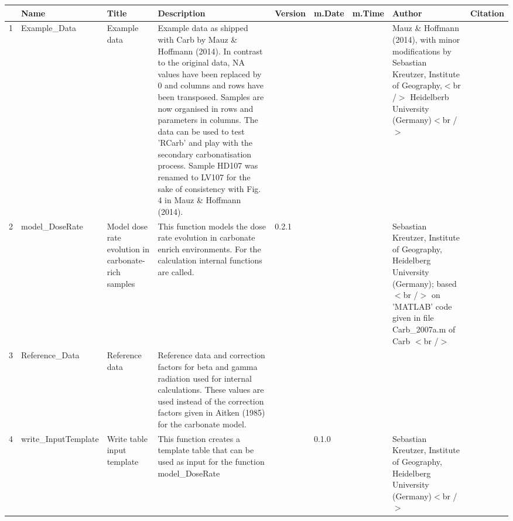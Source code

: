 \begin{table}[ht]
\centering
\begin{tabular}{rllllllll}
  \hline
 & Name & Title & Description & Version & m.Date & m.Time & Author & Citation \\ 
  \hline
1 & Example\_Data & Example data & Example data as shipped with  Carb  by Mauz \& Hoffmann (2014). In contrast to the original data,  NA  values have been replaced by 0 and columns and rows have been transposed. Samples are now organised in rows and parameters in columns.  The data can be used to test  'RCarb'  and play with the secondary carbonatisation process. Sample HD107 was renamed to LV107 for the sake of consistency with Fig. 4 in Mauz \& Hoffmann (2014). &  &  &  & Mauz \& Hoffmann (2014), with minor modifications by Sebastian Kreutzer, Institute of Geography,$<$br /$>$ Heidelberb University (Germany)$<$br /$>$ &  \\ 
  2 & model\_DoseRate & Model dose rate evolution in carbonate-rich samples & This function models the dose rate evolution in carbonate enrich environments. For the calculation internal functions are called. & 0.2.1
 &  &  & Sebastian Kreutzer, Institute of Geography, Heidelberg University (Germany); based$<$br /$>$ on 'MATLAB' code given in file Carb\_2007a.m of  Carb $<$br /$>$ &  \\ 
  3 & Reference\_Data & Reference data & Reference data and correction factors for beta and gamma radiation used for internal calculations. These values are used instead of the correction factors given in Aitken (1985) for the carbonate model. &  &  &  &  &  \\ 
  4 & write\_InputTemplate & Write table input template & This function creates a template table that can be used as input for the function model\_DoseRate &  & 0.1.0
 &  & Sebastian Kreutzer, Institute of Geography, Heidelberg University (Germany)$<$br /$>$ &  \\ 
   \hline
\end{tabular}
\end{table}

